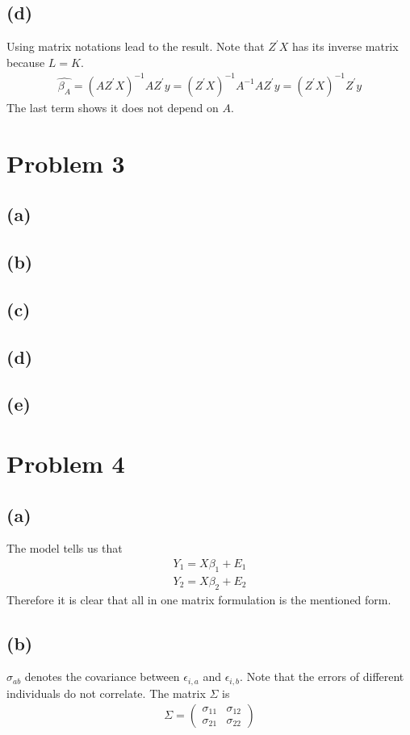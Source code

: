 \documentclass{article}
\begin{document}
\subsection{(d)}
Using matrix notations lead to the result. Note that $Z^{'}X$ has its inverse matrix because $L = K$.
\begin{align*}
	\hat{\beta_A} = (AZ^{'}X)^{-1}AZ^{'}y = (Z^{'}X)^{-1}A^{-1}AZ^{'}y = (Z^{'}X)^{-1}Z^{'}y
\end{align*}
The last term shows it does not depend on $A$.

\section{Problem 3}
\subsection{(a)}
\subsection{(b)}
\subsection{(c)}
\subsection{(d)}
\subsection{(e)}

\section{Problem 4}
\subsection{(a)}
The model tells us that
\begin{align*}
	Y_1 = X\beta_1 + E_1\\
	Y_2 = X\beta_2 + E_2
\end{align*}
Therefore it is clear that all in one matrix formulation is the mentioned form.

\subsection{(b)}
$\sigma_{ab}$ denotes the covariance between $\epsilon_{i,a}$ and $\epsilon_{i, b}$. Note that the errors of different individuals do not correlate. The matrix $\Sigma$ is
\begin{align*}
\Sigma = \begin{pmatrix}
\sigma_{11} & \sigma_{12}\\
\sigma_{21} & \sigma_{22}
\end{pmatrix}
\end{align*}
\end{document}
